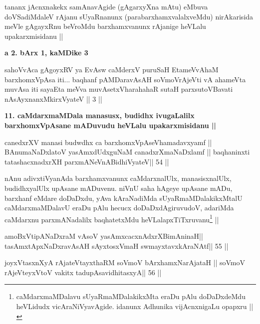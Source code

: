\begin{artha}
tananx jAcnxnakekx samAnavAgide (gAgarxyXna mAtu) eMbuva doVSadiMdaleV rAjanu sUyaRnanunx (parabarxhamxvalalxveMdu) nirAkarisida meVle gAgayxRnu beVroMdu barxhamxvanunx rAjanige heVLalu upakarxmisidanu ||
\end{artha} 

\begin{center}
{\large\bf a 2. bArx 1, kaMDike 3}
\end{center}

\begin{shl}
sahoVvAca gAgoyxRV ya EvAsw caMderxV puruSaH
EtameVvAhaM barxhomxVpAsa iti...
baqhanf pAMDaravAsAH soVmoVrAjeVti
vA ahameVta muvAsa iti sayaEta meVva
muvAsetxV\s harahahaR sutaH parxsutoVBavati
nAsAyxnanxMkirxVyateV || 3 ||
\end{shl}

\begin{artha}
{\bf 11. caMdarxmaMDala manasusx, budidhx ivugaLalilx barxhomxVpAsane mADuvudu heVLalu upakarxmisidanu ||}
\end{artha} 

\begin{shl}
canedxrXV manasi budwdhx ca barxhomxVpAseV\s hamadavxyamf ||
BAnumaNaDxlatoV yasAmxdUdxguNaM canadxrXmaNaDxlamf ||
baqhaninxti tatashacxnadxrXH parxmANeVnABidhiVyateV\hfill || 54 ||
\end{shl}

\begin{artha}
nAnu adivxtiVyanAda barxhamxvanunx caMdarxnalUlx, manasisxnalUlx, budidhxyalUlx upAsane mADuvenu. niVnU saha hAgeye upAsane mADu, barxhanf eMdare doDaDxdu, yAva kAraNadiMda sUyaRmaMDalakikxMtalU caMdarxmaMDalavU eraDu pAlu hecucx doDaDxdAgiruvudoV, adariMda caMdarxnu parxmANadalilx baqhatetxMdu heVLalapxTiTxruvanu\footnote[8]{caMdarxmaMDalavu sUyaRmaMDalakikxMta eraDu pAlu doDaDxdeMdu heVLidudx vicAraNiVyavAgide. idanunx Adhunika vijAcnxnigaLu opapxru ||} ||
\end{artha}

\begin{shl}
amoBxV\s tipANaDxraM vAsoV yasAmxcacxnAdxrXBimAninaH||
tasAmxtApxNaDxravAsAH sAyxtosxVmaH swmayxtavxkAraNAtf\hfill || 55 ||
\end{shl}

\begin{shl}
joyxVtasxnXyA rAjateV\s tayxthaRM soVmoV bArxhamxNarAjataH ||
soVmoV rAjeVteyxVtoV vakitx tadupAsavidhitasxyA\hfill || 56 ||
\end{shl}

